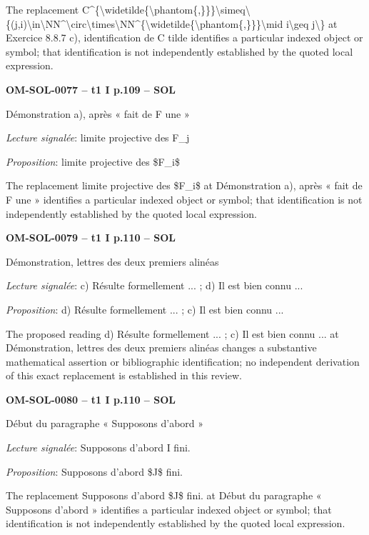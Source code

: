 The replacement C\textasciicircum{}\{\textbackslash{}widetilde\{\textbackslash{}phantom\{,\}\}\}\textbackslash{}simeq\textbackslash{}\{(j,i)\textbackslash{}in\textbackslash{}NN\textasciicircum{}\textbackslash{}circ\textbackslash{}times\textbackslash{}NN\textasciicircum{}\{\textbackslash{}widetilde\{\textbackslash{}phantom\{,\}\}\}\textbackslash{}mid i\textbackslash{}geq j\textbackslash{}\} at Exercice 8.8.7 c), identification de C tilde identifies a particular indexed object or symbol; that identification is not independently established by the quoted local expression.\par
\par\noindent\textbf{OM-SOL-0077 -- t1 I p.109 -- SOL}\par
Démonstration a), après « fait de F une »\par
\emph{Lecture signalée}: limite projective des F\_j\par
\emph{Proposition}: limite projective des \$F\_i\$\par
The replacement limite projective des \$F\_i\$ at Démonstration a), après « fait de F une » identifies a particular indexed object or symbol; that identification is not independently established by the quoted local expression.\par
\par\noindent\textbf{OM-SOL-0079 -- t1 I p.110 -- SOL}\par
Démonstration, lettres des deux premiers alinéas\par
\emph{Lecture signalée}: c) Résulte formellement ... ; d) Il est bien connu ...\par
\emph{Proposition}: d) Résulte formellement ... ; c) Il est bien connu ...\par
The proposed reading d) Résulte formellement ... ; c) Il est bien connu ... at Démonstration, lettres des deux premiers alinéas changes a substantive mathematical assertion or bibliographic identification; no independent derivation of this exact replacement is established in this review.\par
\par\noindent\textbf{OM-SOL-0080 -- t1 I p.110 -- SOL}\par
Début du paragraphe « Supposons d’abord »\par
\emph{Lecture signalée}: Supposons d'abord I fini.\par
\emph{Proposition}: Supposons d'abord \$J\$ fini.\par
The replacement Supposons d'abord \$J\$ fini. at Début du paragraphe « Supposons d’abord » identifies a particular indexed object or symbol; that identification is not independently established by the quoted local expression.\par
